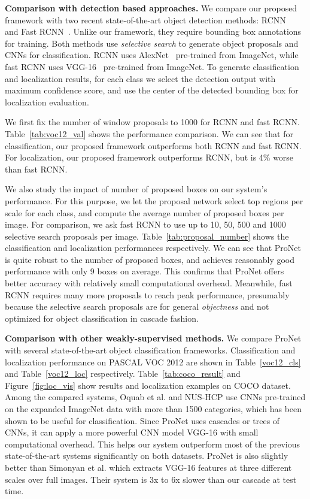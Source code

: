 \documentclass[10pt,twocolumn,letterpaper]{article}
\begin{document}
\textbf{Comparison with detection based approaches.} We compare our proposed framework with two recent state-of-the-art object detection methods: RCNN~\cite{DBLP:journals/corr/GirshickDDM13} and Fast RCNN~\cite{DBLP:journals/corr/Girshick15}. Unlike our framework, they require bounding box annotations for training. Both methods use \textit{selective search} to generate object proposals and CNNs for classification. RCNN uses AlexNet~\cite{NIPS2012_4824} pre-trained from ImageNet, while fast RCNN uses VGG-16~\cite{Simonyan14c} pre-trained from ImageNet. To generate classification and localization results, for each class we select the detection output with maximum confidence score, and use the center of the detected bounding box for localization evaluation.

We first fix the number of window proposals to 1000 for RCNN and fast RCNN. Table~\ref{tab:voc12_val} shows the performance comparison. We can see that for classification, our proposed framework outperforms both RCNN and fast RCNN. For localization, our proposed framework outperforms RCNN, but is 4\% worse than fast RCNN. 

We also study the impact of number of proposed boxes on our system's performance. For this purpose, we let the proposal network select top  regions per scale for each class, and compute the average number of proposed boxes per image. For comparison, we ask fast RCNN to use up to 10, 50, 500 and 1000 selective search proposals per image. Table~\ref{tab:proposal_number} shows the classification and localization performances respectively. We can see that ProNet is quite robust to the number of proposed boxes, and achieves reasonably good performance with only 9 boxes on average. This confirms that ProNet offers better accuracy with relatively small computational overhead. Meanwhile, fast RCNN requires many more proposals to reach peak performance, presumably because the selective search proposals are for general \textit{objectness} and not optimized for object classification in cascade fashion.

\textbf{Comparison with other weakly-supervised methods.} We compare ProNet with several state-of-the-art object classification frameworks. Classification and localization performance on PASCAL VOC 2012 are shown in Table~\ref{voc12_cls} and Table~\ref{voc12_loc} respectively. Table~\ref{tab:coco_result} and Figure~\ref{fig:loc_vis} show results and localization examples on COCO dataset. Among the compared systems, Oquab et al. and NUS-HCP use CNNs pre-trained on the expanded ImageNet data with more than 1500 categories, which has been shown to be useful for classification. Since ProNet uses cascades or trees of CNNs, it can apply a more powerful CNN model VGG-16 with small computational overhead. This helps our system outperform most of the previous state-of-the-art systems significantly on both datasets. ProNet is also slightly better than Simonyan et al. which extracts VGG-16 features at three different scales over full images. Their system is 3x to 6x slower than our cascade at test time.
\end{document}
